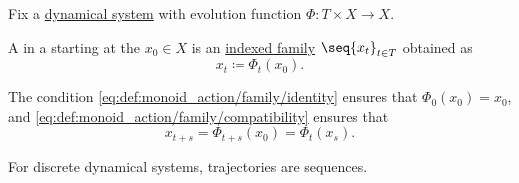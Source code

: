 \begin{definition}\label{def:dynamical_system_trajectory}
  Fix a \hyperref[def:dynamical_system]{dynamical system} with evolution function \( \Phi: T \times X \to X \).

  A  in a starting at the  \( x_0 \in X \) is an \hyperref[def:cartesian_product/indexed_family]{indexed family} \( \seq{ x_t }_{t \in T} \) obtained as
  \begin{equation*}
    x_t \coloneqq \Phi_t(x_0).
  \end{equation*}

  The condition \ref{eq:def:monoid_action/family/identity} ensures that \( \Phi_0(x_0) = x_0 \), and \ref{eq:def:monoid_action/family/compatibility} ensures that
  \begin{equation*}
    x_{t + s}
    =
    \Phi_{t + s}(x_0)
    =
    \Phi_t(x_s).
  \end{equation*}

  For discrete dynamical systems, trajectories are sequences.
\end{definition}
